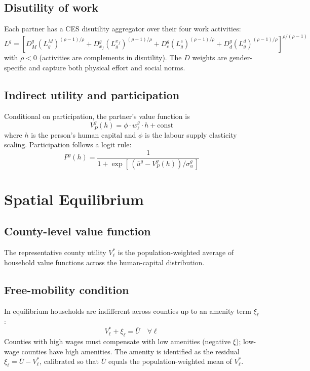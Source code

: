 \documentclass[11pt,a4paper]{article}
\begin{document}
\subsection{Disutility of work}

Each partner has a CES disutility aggregator over their four work
activities:
\[
  L^g = \left[
       D^g_M (L^M_g)^{(\rho-1)/\rho}
     + D^g_{x_f} (L^{x_f}_g)^{(\rho-1)/\rho}
     + D^g_c (L^c_g)^{(\rho-1)/\rho}
     + D^g_d (L^d_g)^{(\rho-1)/\rho}
     \right]^{\rho/(\rho-1)}
\]
with $\rho < 0$ (activities are complements in disutility).
The $D$ weights are gender-specific and capture both physical effort
and social norms.

\subsection{Indirect utility and participation}

Conditional on participation, the partner's value function is
\[
  V^g_P(h) = \phi \cdot w^g_\ell \cdot h + \text{const}
\]
where $h$ is the person's human capital and $\phi$ is the labour supply
elasticity scaling. Participation follows a logit rule:
\[
  P^g(h) = \frac{1}{1 + \exp\!\left[\,(\bar u^g - V^g_P(h))/\sigma^g_u\,\right]}
\]

\section{Spatial Equilibrium}

\subsection{County-level value function}

The representative county utility $V^*_\ell$ is the
population-weighted average of household value functions across the
human-capital distribution.

\subsection{Free-mobility condition}

In equilibrium households are indifferent across counties up to an
amenity term $\xi_\ell$:
\[
  V^*_\ell + \xi_\ell = \bar U \quad \forall \ell
\]
Counties with high wages must compensate with low amenities (negative
$\xi$); low-wage counties have high amenities. The amenity is identified
as the residual $\xi_\ell = \bar U - V^*_\ell$, calibrated so that
$\bar U$ equals the population-weighted mean of $V^*_\ell$.
\end{document}
